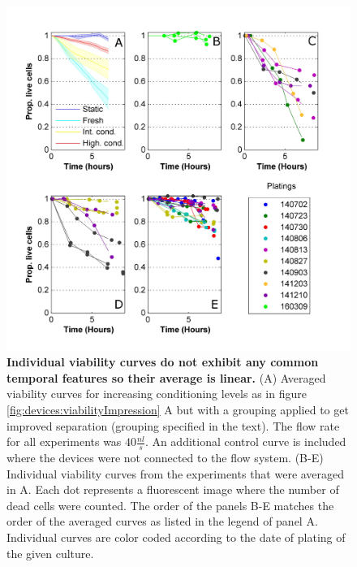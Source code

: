     \begin{figure}[!htb]
            \centering
            \includegraphics[width=15cm]{chapter4/figures/condDetAnalysis/condDetAnalysis.jpg}
            \caption[Example of viability curves from individual steady flow experiments]{\textbf{Individual viability curves do not exhibit any common temporal features so their average is linear.} (A) Averaged viability curves for increasing conditioning levels as in figure \ref{fig:devices:viabilityImpression} A but with a grouping applied to get improved separation (grouping specified in the text). The flow rate for all experiments was \(40\frac{nl}{s}\). An additional control curve is included where the devices were not connected to the flow system. (B-E) Individual viability curves from the experiments that were averaged in A. Each dot represents a fluorescent image where the number of dead cells were counted. The order of the panels B-E matches the order of the averaged curves as listed in the legend of panel A. Individual curves are color coded according to the date of plating of the given culture.}
            \label{fig:devices:viabilityDetAnalysis}
    \end{figure}



